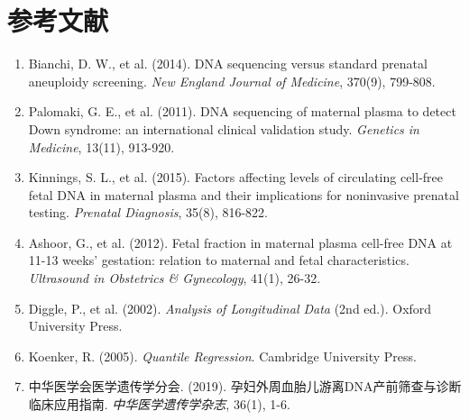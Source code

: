 ﻿\documentclass[12pt,a4paper]{article}
\begin{document}
\section{参考文献}
\begin{enumerate}
    \item Bianchi, D. W., et al. (2014). DNA sequencing versus standard prenatal aneuploidy screening. \textit{New England Journal of Medicine}, 370(9), 799-808.
    \item Palomaki, G. E., et al. (2011). DNA sequencing of maternal plasma to detect Down syndrome: an international clinical validation study. \textit{Genetics in Medicine}, 13(11), 913-920.
    \item Kinnings, S. L., et al. (2015). Factors affecting levels of circulating cell-free fetal DNA in maternal plasma and their implications for noninvasive prenatal testing. \textit{Prenatal Diagnosis}, 35(8), 816-822.
    \item Ashoor, G., et al. (2012). Fetal fraction in maternal plasma cell-free DNA at 11-13 weeks' gestation: relation to maternal and fetal characteristics. \textit{Ultrasound in Obstetrics \& Gynecology}, 41(1), 26-32.
    \item Diggle, P., et al. (2002). \textit{Analysis of Longitudinal Data} (2nd ed.). Oxford University Press.
    \item Koenker, R. (2005). \textit{Quantile Regression}. Cambridge University Press.
    \item 中华医学会医学遗传学分会. (2019). 孕妇外周血胎儿游离DNA产前筛查与诊断临床应用指南. \textit{中华医学遗传学杂志}, 36(1), 1-6.
\end{enumerate}
\end{document}
